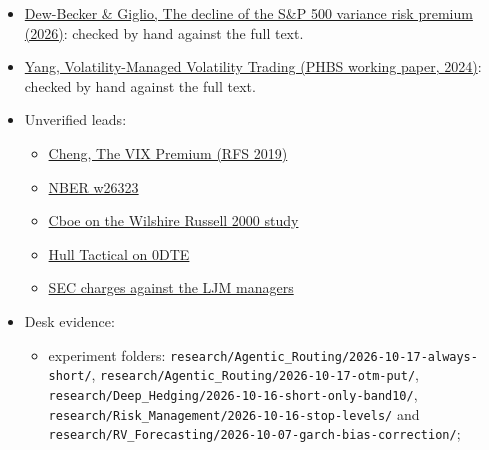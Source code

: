 \documentclass{article}
\begin{document}
\begin{itemize}
\item \href{https://www.dew-becker.org/documents/option_decline.pdf}{Dew-Becker \& Giglio, The decline of the S\&P 500 variance risk premium (2026)}: checked by hand against the full text.

\item \href{https://english.phbs.pku.edu.cn/uploadfile/2024/0530/20240530092144610.pdf}{Yang, Volatility-Managed Volatility Trading (PHBS working paper, 2024)}: checked by hand against the full text.

\item Unverified leads:

\begin{itemize}

\item \href{https://utoronto.scholaris.ca/bitstreams/682f3c99-5d7d-4dee-b4b4-dafa83785523/download}{Cheng, The VIX Premium (RFS 2019)}

\item \href{https://www.nber.org/papers/w26323}{NBER w26323}

\item \href{https://www.cboe.com/insights/posts/new-wilshire-paper-uncovers-where-to-find-enhanced-risk-adjusted-returns}{Cboe on the Wilshire Russell 2000 study}

\item \href{https://hulltactical.com/2026/07/08/0dte-options-tiny-edge-huge-distribution/}{Hull Tactical on 0DTE}

\item \href{https://www.wealthmanagement.com/regulation-compliance/sec-charges-portfolio-managers-misleading-investors-over-funds-risks}{SEC charges against the LJM managers}

\end{itemize}

\item Desk evidence:

\begin{itemize}

\item experiment folders: \texttt{research/\allowbreak{}Agentic\_\allowbreak{}Routing/\allowbreak{}2026-\allowbreak{}10-\allowbreak{}17-\allowbreak{}always-\allowbreak{}short/\allowbreak{}}, \texttt{research/\allowbreak{}Agentic\_\allowbreak{}Routing/\allowbreak{}2026-\allowbreak{}10-\allowbreak{}17-\allowbreak{}otm-\allowbreak{}put/\allowbreak{}}, \texttt{research/\allowbreak{}Deep\_\allowbreak{}Hedging/\allowbreak{}2026-\allowbreak{}10-\allowbreak{}16-\allowbreak{}short-\allowbreak{}only-\allowbreak{}band10/\allowbreak{}}, \texttt{research/\allowbreak{}Risk\_\allowbreak{}Management/\allowbreak{}2026-\allowbreak{}10-\allowbreak{}16-\allowbreak{}stop-\allowbreak{}levels/\allowbreak{}} and \texttt{research/\allowbreak{}RV\_\allowbreak{}Forecasting/\allowbreak{}2026-\allowbreak{}10-\allowbreak{}07-\allowbreak{}garch-\allowbreak{}bias-\allowbreak{}correction/\allowbreak{}};


\end{itemize}
\end{itemize}
\end{document}
